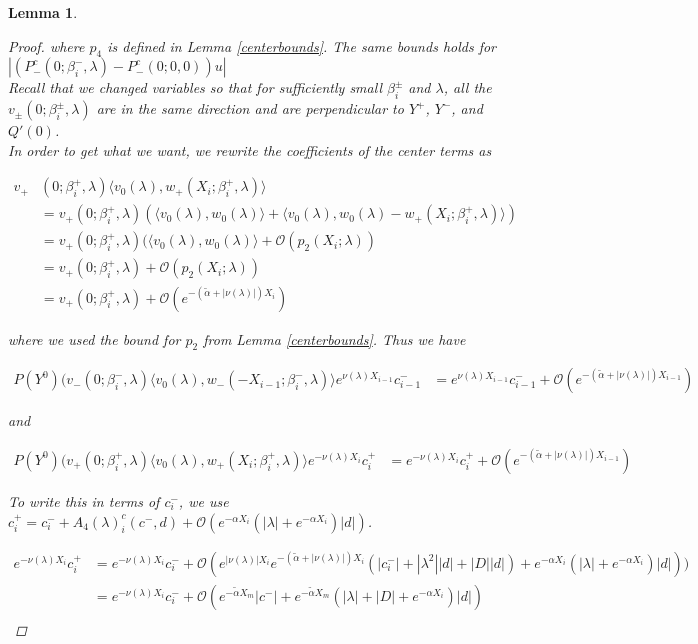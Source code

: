 \documentclass[12pt]{article}
\newtheorem{lemma}{Lemma}
\begin{document}
\begin{lemma}
\begin{proof}
where $p_4$ is defined in Lemma \ref{centerbounds}. The same bounds holds for $|(P^c_-(0; \beta_i^-, \lambda) - P^c_-(0; 0, 0) )u|$\\

Recall that we changed variables so that for sufficiently small $\beta_i^\pm$ and $\lambda$, all the $v_\pm(0; \beta_i^\pm, \lambda)$ are in the same direction and are perpendicular to $Y^+$, $Y^-$, and $Q'(0)$.\\

In order to get what we want, we rewrite the coefficients of the center terms as

\begin{align*}
v_+&(0; \beta_i^+, \lambda) \langle v_0(\lambda), w_+(X_i; \beta_i^+, \lambda) \rangle \\
&= v_+(0; \beta_i^+, \lambda) ( \langle v_0(\lambda), w_0(\lambda) \rangle + \langle v_0(\lambda), w_0(\lambda) - w_+(X_i; \beta_i^+, \lambda) \rangle) \\
&= v_+(0; \beta_i^+, \lambda) ( \langle v_0(\lambda), w_0(\lambda) \rangle + \mathcal{O}(p_2(X_i; \lambda)) \\
&= v_+(0; \beta_i^+, \lambda) + \mathcal{O}(p_2(X_i; \lambda)) \\
&= v_+(0; \beta_i^+, \lambda) + \mathcal{O}( e^{-(\tilde{\alpha} + |\nu(\lambda)|)X_i})
\end{align*}

where we used the bound for $p_2$ from Lemma \ref{centerbounds}. Thus we have

\begin{align*}
P(Y^0) ( v_-(0; \beta_i^-, \lambda) \langle v_0(\lambda), w_-(-X_{i-1}; \beta_i^-, \lambda) \rangle e^{\nu(\lambda)X_{i-1}} c_{i-1}^- &= e^{\nu(\lambda)X_{i-1}} c_{i-1}^- + \mathcal{O}( e^{-(\tilde{\alpha} + |\nu(\lambda)|)X_{i-1}})
\end{align*}

and

\begin{align*}
P(Y^0) ( v_+(0; \beta_i^+, \lambda) \langle v_0(\lambda), w_+(X_i; \beta_i^+, \lambda) \rangle e^{-\nu(\lambda)X_i} c_i^+ &= e^{-\nu(\lambda)X_i} c_i^+ + \mathcal{O}( e^{-(\tilde{\alpha} + |\nu(\lambda)|)X_{i-1}})
\end{align*}

To write this in terms of $c_i^-$, we use $c_i^+ = c_i^- + A_4(\lambda)_i^c(c^-, d) + \mathcal{O}( e^{-\alpha X_i} (|\lambda| +  e^{-\alpha X_i} ) |d| )$.

\begin{align*}
e^{-\nu(\lambda)X_i} c_i^+ &= e^{-\nu(\lambda)X_i} c_i^- + \mathcal{O}(e^{|\nu(\lambda)|X_i} e^{-(\tilde{\alpha} + |\nu(\lambda)|)X_i} ( |c_i^-| + |\lambda^2| |d|+ |D||d|) +  e^{-\alpha X_i} (|\lambda| +  e^{-\alpha X_i} ) |d| )) \\
&= e^{-\nu(\lambda)X_i} c_i^- + \mathcal{O}(e^{-\tilde{\alpha} X_m} |c^-| 
+ e^{-\tilde{\alpha} X_m}( |\lambda| + |D| + e^{-\alpha X_i} ) |d| ) \\
\end{align*}


\end{proof}
\end{lemma}
\end{document}
